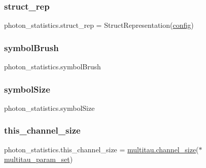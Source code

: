 \subsubsection{\texorpdfstring{struct\+\_\+rep}{struct\_rep}}
{\footnotesize\ttfamily photon\+\_\+statistics.\+struct\+\_\+rep = Struct\+Representation(\hyperlink{namespacephoton__statistics_a4176c548148b1c86da6ddf320ab00e90}{config})}

\mbox{\label{namespacephoton__statistics_a5b8d0a21492531701eaab526f8d6ffda}} 
\subsubsection{\texorpdfstring{symbol\+Brush}{symbolBrush}}
{\footnotesize\ttfamily photon\+\_\+statistics.\+symbol\+Brush}

\mbox{\label{namespacephoton__statistics_a31d8b2d681ba8e84148ca5a7a7d97829}} 
\subsubsection{\texorpdfstring{symbol\+Size}{symbolSize}}
{\footnotesize\ttfamily photon\+\_\+statistics.\+symbol\+Size}

\mbox{\label{namespacephoton__statistics_a397f80b778ada9e9d514e3ed06936540}} 
\subsubsection{\texorpdfstring{this\+\_\+channel\+\_\+size}{this\_channel\_size}}
{\footnotesize\ttfamily photon\+\_\+statistics.\+this\+\_\+channel\+\_\+size = \hyperlink{namespacemultitau_a1022c52950a892396ac45e7de5379e12}{multitau.\+channel\+\_\+size}($\ast$\hyperlink{namespacephoton__statistics_a3c57d728c4b1cdcb2b6ca63bc6adfc4d}{multitau\+\_\+param\+\_\+set})}


